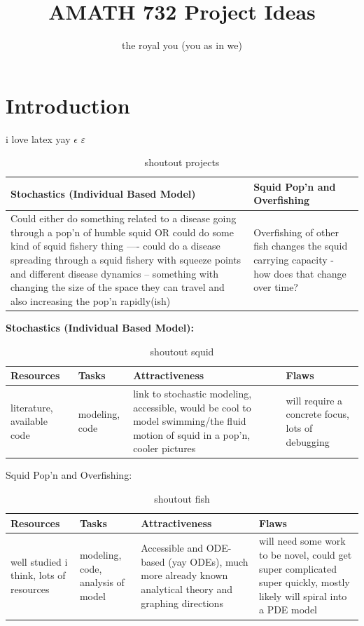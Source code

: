 \documentclass[12pt]{article}
\begin{document}
\title{AMATH 732 Project Ideas}
\author{the royal you (you as in we)}
\maketitle

\section{Introduction}
i love latex
yay $\epsilon$ $\varepsilon$

\begin{table}[H]
    \centering
    \begin{tabular}{p{3in}|p{3in}}
         Stochastics (Individual Based Model)  & Squid Pop'n and Overfishing \\ \hline
         Could either do something related to a disease going through a pop'n of humble squid OR could do some kind of squid fishery thing ---- could do a disease spreading through a squid fishery with squeeze points and different disease dynamics -- something with changing the size of the space they can travel and also increasing the pop'n rapidly(ish) & Overfishing of other fish changes the squid carrying capacity - how does that change over time? \\
    \end{tabular}
    \caption{shoutout projects}
\end{table}

\textbf{Stochastics (Individual Based Model):}
\begin{table}[H]
    \centering
    \begin{tabular}{p{1.5in}|p{1.5in}|p{1.5in}|p{1.5in}}
         Resources  & Tasks & Attractiveness & Flaws \\ \hline
         literature, available code & modeling, code & link to stochastic modeling, accessible, would be cool to model swimming/the fluid motion of squid in a pop'n, cooler pictures & will require a concrete focus, lots of debugging \\
    \end{tabular}
    \caption{shoutout squid}
\end{table}


Squid Pop'n and Overfishing:
\begin{table}[H]
    \centering
    \begin{tabular}{p{1.5in}|p{1.5in}|p{1.5in}|p{1.5in}}
         Resources  & Tasks & Attractiveness & Flaws \\ \hline
         well studied i think, lots of resources  & modeling, code, analysis of model & Accessible and ODE-based (yay ODEs), much more already known analytical theory and graphing directions & will need some work to be novel, could get super complicated super quickly, mostly likely will spiral into a PDE model \\
    \end{tabular}
    \caption{shoutout fish}
\end{table}
\end{document}
